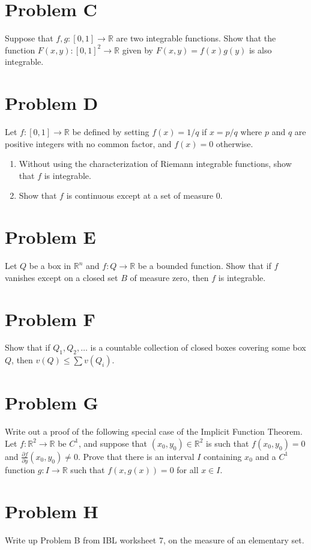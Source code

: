 \documentclass[lang=en,11pt]{template}
\begin{document}
\section*{Problem C}
Suppose that $f, g : [0, 1] \to \mathbb{R}$ are two integrable functions. Show that the function $F (x, y) : [0, 1]^2 \to \mathbb{R}$ given by $F (x, y) = f(x)g(y)$ is also integrable.

\section*{Problem D}
Let $f : [0, 1] \to \mathbb{R}$ be defined by setting $f(x) = 1/q$ if $x = p/q$ where $p$ and $q$ are positive integers with no common factor, and $f(x) = 0$ otherwise.
\begin{enumerate}
    \item Without using the characterization of Riemann integrable functions, show that $f$ is integrable.
    \item Show that $f$ is continuous except at a set of measure 0.
\end{enumerate}

\section*{Problem E}
Let $Q$ be a box in $\mathbb{R}^n$ and $f : Q \to \mathbb{R}$ be a bounded function. Show that if $f$ vanishes except on a closed set $B$ of measure zero, then $f$ is integrable.

\section*{Problem F}
Show that if $Q_1, Q_2, \dots$ is a countable collection of closed boxes covering some box $Q$, then $v(Q) \leq \sum v(Q_i)$.


\section*{Problem G}
Write out a proof of the following special case of the Implicit Function Theorem. Let $f : \mathbb{R}^2 \to \mathbb{R}$ be $C^1$, and suppose that $(x_0, y_0) \in \mathbb{R}^2$ is such that $f(x_0, y_0) = 0$ and $\frac{\partial f}{\partial y}(x_0, y_0) \neq 0$. Prove that there is an interval $I$ containing $x_0$ and a $C^1$ function $g : I \to \mathbb{R}$ such that $f(x, g(x)) = 0$ for all $x \in I$.

\section*{Problem H}
Write up Problem B from IBL worksheet 7, on the measure of an elementary set.
\end{document}
